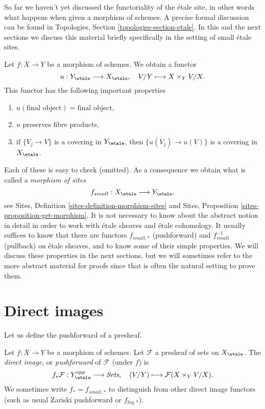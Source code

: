 \noindent
So far we haven't yet discussed the functoriality of the \'etale site, in
other words what happens when given a morphism of schemes. A precise formal
discussion can be found in
Topologies, Section \ref{topologies-section-etale}.
In this and the next sections we discuss this material briefly specifically
in the setting of small \'etale sites.

\medskip\noindent
Let $f : X \to Y$ be a morphism of schemes. We obtain a functor
\begin{equation}
\label{equation-functorial}
u : Y_\etale \longrightarrow X_\etale, \quad
V/Y \longmapsto X \times_Y V/X.
\end{equation}
This functor has the following important properties
\begin{enumerate}
\item $u(\text{final object}) = \text{final object}$,
\item $u$ preserves fibre products,
\item if $\{V_j \to V\}$ is a covering in $Y_\etale$, then
$\{u(V_j) \to u(V)\}$ is a covering in $X_\etale$.
\end{enumerate}
Each of these is easy to check (omitted). As a consequence we obtain what
is called a {\it morphism of sites}
$$
f_{small} : X_\etale \longrightarrow Y_\etale,
$$
see
Sites, Definition \ref{sites-definition-morphism-sites}
and
Sites, Proposition \ref{sites-proposition-get-morphism}.
It is not necessary to know about the abstract notion in detail
in order to work with \'etale sheaves and \'etale cohomology.
It usually suffices to know that there are functors
$f_{small, *}$ (pushforward) and $f_{small}^{-1}$ (pullback)
on \'etale sheaves, and to know some of their simple properties.
We will discuss these properties in the next sections, but we will
sometimes refer to the more abstract material for proofs since
that is often the natural setting to prove them.


\section{Direct images}
\label{section-direct-image}

\noindent
Let us define the pushforward of a presheaf.

\begin{definition}
\label{definition-direct-image-presheaf}
Let $f: X\to Y$ be a morphism of schemes.
Let $\mathcal{F} $ a presheaf of sets on $X_\etale$.
The {\it direct image}, or {\it pushforward} of $\mathcal{F}$
(under $f$) is
$$
f_*\mathcal{F} : Y_\etale^{opp} \longrightarrow \textit{Sets}, \quad
(V/Y) \longmapsto \mathcal{F}(X \times_Y V/X).
$$
We sometimes write $f_* = f_{small, *}$ to distinguish from other
direct image functors (such as usual Zariski pushforward or $f_{big, *}$).
\end{definition}

